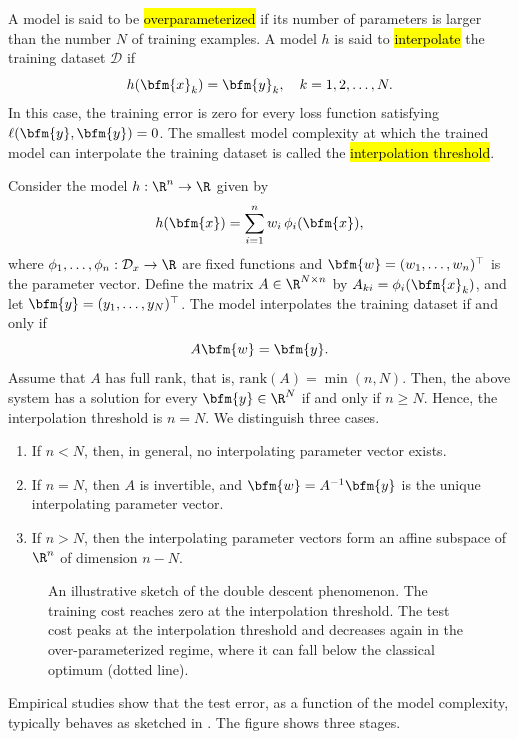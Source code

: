 A model is said to be \hl{overparameterized} if its number of parameters is larger than the number $N$ of training examples. A model $h$ is said to \hl{interpolate} the training dataset $\mathcal{D}$ if
$$
h(\bfm{x}_k) = \bfm{y}_k, \quad k=1,2,\ldots,N.
$$
In this case, the training error is zero for every loss function satisfying $\ell(\bfm{y},\bfm{y})=0$. The smallest model complexity at which the trained model can interpolate the training dataset is called the \hl{interpolation threshold}.
\begin{example}\label{interpolation.threshold.exam}
Consider the model $h: \R^{n}\rightarrow \R$ given by
$$
h(\bfm{x}) = \sum_{i=1}^{n} w_i\, \phi_i(\bfm{x}),
$$
where $\phi_1,\ldots,\phi_n:\mathcal{D}_x\rightarrow\R$ are fixed functions and $\bfm{w}=(w_1,\ldots,w_n)^\top$ is the parameter vector. Define the matrix $A\in\R^{N\times n}$ by $A_{ki}=\phi_i(\bfm{x}_k)$, and let $\bfm{y}=(y_1,\ldots,y_N)^\top$. The model interpolates the training dataset if and only if
$$
A\bfm{w} = \bfm{y}.
$$
Assume that $A$ has full rank, that is, $\mathrm{rank}(A)=\min(n,N)$. Then, the above system has a solution for every $\bfm{y}\in\R^N$ if and only if $n\ge N$. Hence, the interpolation threshold is $n=N$. We distinguish three cases.
\begin{enumerate}
\item If $n < N$, then, in general, no interpolating parameter vector exists.
\item If $n=N$, then $A$ is invertible, and $\bfm{w}=A^{-1}\bfm{y}$ is the unique interpolating parameter vector.
\item If $n > N$, then the interpolating parameter vectors form an affine subspace of $\R^n$ of dimension $n-N$.
\end{enumerate}
\end{example}
\begin{figure}[t]
\centering

\caption{An illustrative sketch of the double descent phenomenon. The training cost reaches zero at the interpolation threshold. The test cost peaks at the interpolation threshold and decreases again in the over-parameterized regime, where it can fall below the classical optimum (dotted line).}
\label{double.descent.fig}
\end{figure}
Empirical studies show that the test error, as a function of the model complexity, typically behaves as sketched in . The figure shows three stages.
